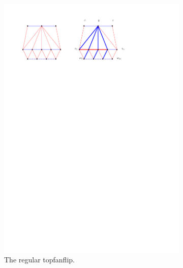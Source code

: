 

\begin{figure}[!b]
    \centering
    \begin{subfigure}[b]{0.8 \textwidth}
        \includegraphics[width = \textwidth]{topFanFlips/img/regular}
        \caption{The regular topfanflip.}
        \label{fig:fanflip:regular}
    \end{subfigure}
    ~
    \centering
    \begin{subfigure}[b]{0.45 \textwidth}

\end{subfigure}
\end{figure}
